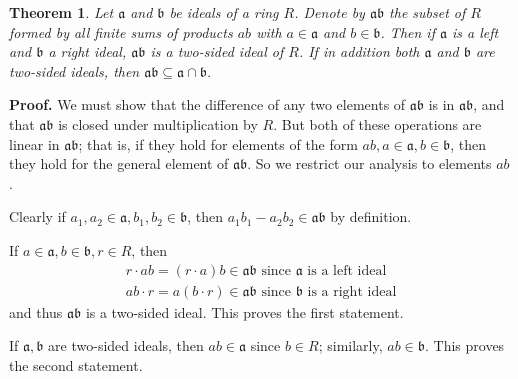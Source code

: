 \documentclass[12pt]{article}
\newtheorem{thm}{Theorem}
\begin{document}
\begin{thm} Let $ \mathfrak{a}$ and $ \mathfrak{b}$ be ideals of a ring $ R$. Denote by $ \mathfrak{ab}$ the subset of $ R$ formed by all finite sums of products $ ab$ with $ a \in \mathfrak{a}$ and $ b \in \mathfrak{b}$. Then if $ \mathfrak{a}$ is a left and $ \mathfrak{b}$ a right ideal, $ \mathfrak{ab}$ is a two-sided ideal of $ R$. If in addition both $ \mathfrak{a}$ and $ \mathfrak{b}$ are two-sided ideals, then $ \mathfrak{ab} \subseteq \mathfrak{a}\cap\mathfrak{b}$.
\end{thm}

\textbf{Proof.} 
We must show that the difference of any two elements of $\mathfrak{ab}$ is in $\mathfrak{ab}$, and that $\mathfrak{ab}$ is closed under multiplication by $R$. But both of these operations are linear in $\mathfrak{ab}$; that is, if they hold for elements of the form $ab, a\in\mathfrak{a}, b\in\mathfrak{b}$, then they hold for the general element of $\mathfrak{ab}$. So we restrict our analysis to elements $ab$.

Clearly if $a_1,a_2\in \mathfrak{a}, b_1,b_2\in\mathfrak{b}$, then $a_1b_1-a_2b_2\in\mathfrak{ab}$ by definition. 

If $a\in\mathfrak{a}, b\in\mathfrak{b}, r\in R$, then
\begin{gather*}
r \cdot ab = (r\cdot a)b\in\mathfrak{ab} \text{ since } \mathfrak{a} \text{ is a left ideal} \\
ab \cdot r = a(b\cdot r)\in\mathfrak{ab} \text{ since } \mathfrak{b} \text{ is a right ideal}
\end{gather*}
and thus $\mathfrak{ab}$ is a two-sided ideal. This proves the first statement.

If $\mathfrak{a},\mathfrak{b}$ are two-sided ideals, then $ab\in\mathfrak{a}$ since $b\in R$; similarly, $ab\in\mathfrak{b}$. This proves the second statement.
\end{document}
